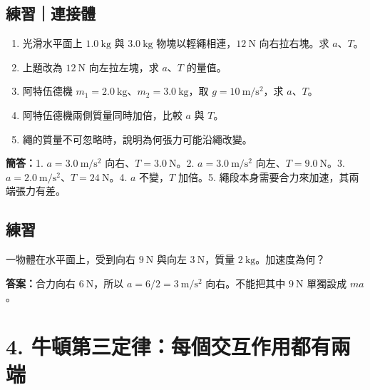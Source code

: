 \documentclass[11pt,a4paper]{article}
\providecommand{\tightlist}{%
  \setlength{\itemsep}{0pt}\setlength{\parskip}{0pt}}
\begin{document}
\begin{HandoutSelfCheck}

\subsection{練習｜連接體}\label{ux7df4ux7fd2ux9023ux63a5ux9ad4}

\begin{enumerate}
\def\labelenumi{\arabic{enumi}.}
\tightlist
\item
  光滑水平面上 \(1.0\ \mathrm{kg}\) 與 \(3.0\ \mathrm{kg}\) 物塊以輕繩相連，\(12\ \mathrm N\) 向右拉右塊。求 \(a\)、\(T\)。
\item
  上題改為 \(12\ \mathrm N\) 向左拉左塊，求 \(a\)、\(T\) 的量值。
\item
  阿特伍德機 \(m_1=2.0\ \mathrm{kg}\)、\(m_2=3.0\ \mathrm{kg}\)，取 \(g=10\ \mathrm{m/s^2}\)，求 \(a\)、\(T\)。
\item
  阿特伍德機兩側質量同時加倍，比較 \(a\) 與 \(T\)。
\item
  繩的質量不可忽略時，說明為何張力可能沿繩改變。
\end{enumerate}

\textbf{簡答：}1. \(a=3.0\ \mathrm{m/s^2}\) 向右、\(T=3.0\ \mathrm N\)。2. \(a=3.0\ \mathrm{m/s^2}\) 向左、\(T=9.0\ \mathrm N\)。3. \(a=2.0\ \mathrm{m/s^2}\)、\(T=24\ \mathrm N\)。4. \(a\) 不變，\(T\) 加倍。5. 繩段本身需要合力來加速，其兩端張力有差。

\end{HandoutSelfCheck}

\begin{HandoutSelfCheck}

\subsection{練習}\label{ux7df4ux7fd2-3}

一物體在水平面上，受到向右 \(9\ \mathrm N\) 與向左 \(3\ \mathrm N\)，質量 \(2\ \mathrm{kg}\)。加速度為何？

\textbf{答案：}合力向右 \(6\ \mathrm N\)，所以 \(a=6/2=3\ \mathrm{m/s^2}\) 向右。不能把其中 \(9\ \mathrm N\) 單獨設成 \(ma\)。

\end{HandoutSelfCheck}

\section{4. 牛頓第三定律：每個交互作用都有兩端}\label{ux725bux9813ux7b2cux4e09ux5b9aux5f8bux6bcfux500bux4ea4ux4e92ux4f5cux7528ux90fdux6709ux5169ux7aef}
\end{document}
